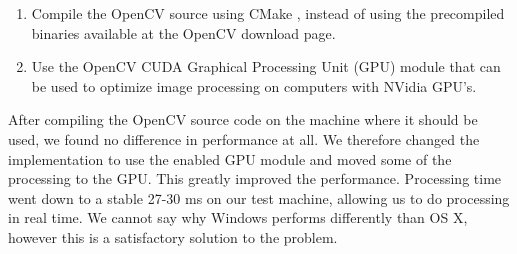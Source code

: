 \begin{enumerate}
    \item Compile the OpenCV source using CMake \cite{cmake}, instead of using the precompiled binaries available at the OpenCV download page.
    \item Use the OpenCV CUDA \cite{cuda} Graphical Processing Unit (GPU) module that can be used to optimize image processing on computers with NVidia GPU's.
\end{enumerate}

After compiling the OpenCV source code on the machine where it should be used, we found no difference in performance at all. We therefore changed the implementation to use the enabled GPU module and moved some of the processing to the GPU. This greatly improved the performance. Processing time went down to a stable 27-30 ms on our test machine, allowing us to do processing in real time. We cannot say why Windows performs differently than OS X, however this is a satisfactory solution to the problem.\\

